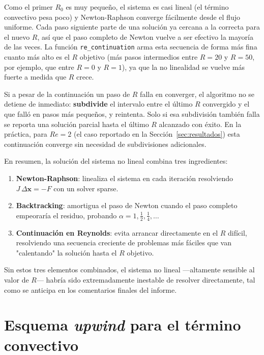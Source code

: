 \documentclass[12pt, a4paper]{article}
\begin{document}
Como el primer $R_0$ es muy pequeño, el sistema es casi lineal (el término
convectivo pesa poco) y Newton-Raphson converge fácilmente desde el flujo
uniforme. Cada paso siguiente parte de una solución ya cercana a la correcta
para el nuevo $R$, así que el paso completo de Newton vuelve a ser efectivo
la mayoría de las veces. La función \texttt{re\_continuation} arma esta
secuencia de forma más fina cuanto más alto es el $R$ objetivo (más pasos
intermedios entre $R=20$ y $R=50$, por ejemplo, que entre $R=0$ y $R=1$),
ya que la no linealidad se vuelve más fuerte a medida que $R$ crece.

Si a pesar de la continuación un paso de $R$ falla en converger, el algoritmo
no se detiene de inmediato: \textbf{subdivide} el intervalo entre el último
$R$ convergido y el que falló en pasos más pequeños, y reintenta. Solo si esa
subdivisión también falla se reporta una solución parcial hasta el último $R$
alcanzado con éxito. En la práctica, para $Re=2$ (el caso reportado en la
Sección~\ref{sec:resultados}) esta continuación converge sin necesidad de
subdivisiones adicionales.

\begin{notabox}
  En resumen, la solución del sistema no lineal combina tres ingredientes:
  \begin{enumerate}
    \item \textbf{Newton-Raphson}: linealiza el sistema en cada iteración
          resolviendo $J\,\Delta\mathbf{x} = -F$ con un solver sparse.
    \item \textbf{Backtracking}: amortigua el paso de Newton cuando el paso
          completo empeoraría el residuo, probando $\alpha = 1, \tfrac12,
          \tfrac14,\dots$
    \item \textbf{Continuación en Reynolds}: evita arrancar directamente en
          el $R$ difícil, resolviendo una secuencia creciente de problemas
          más fáciles que van "calentando" la solución hasta el $R$ objetivo.
  \end{enumerate}
  Sin estos tres elementos combinados, el sistema no lineal —altamente
  sensible al valor de $R$— habría sido extremadamente inestable de resolver
  directamente, tal como se anticipa en los comentarios finales del informe.
\end{notabox}

\section{Esquema \emph{upwind} para el término convectivo}
\label{sec:upwind}
\end{document}
